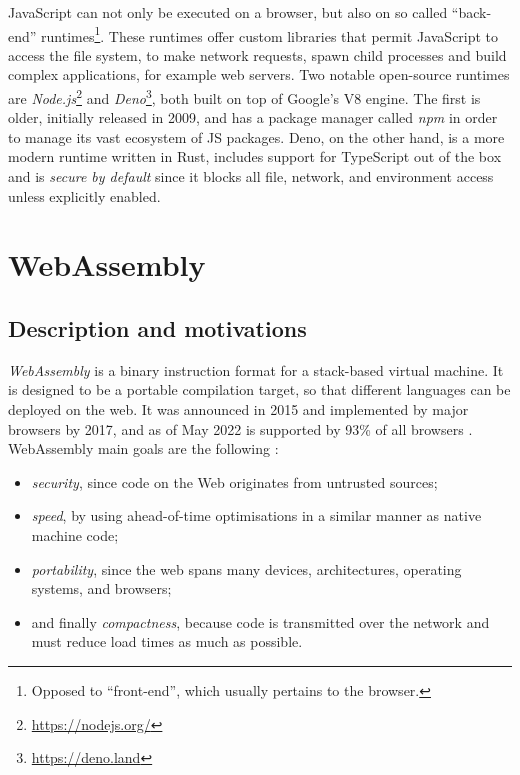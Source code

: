 JavaScript can not only be executed on a browser, but also on so called ``back-end''
runtimes\footnote{Opposed to ``front-end'', which usually pertains to the browser.}.
These runtimes offer custom libraries that permit JavaScript to access the file system, to make network requests,
spawn child processes and build complex applications, for example web servers.
Two notable open-source runtimes are \textit{Node.js}\footnote{\url{https://nodejs.org/}} and \textit{Deno}\footnote{\url{https://deno.land}},
both built on top of Google's V8 engine.
The first is older, initially released in 2009, and has a package manager called \textit{npm}
in order to manage its vast ecosystem of JS packages.
Deno, on the other hand, is a more modern runtime written in Rust, includes support for TypeScript out of the box
and is \textit{secure by default} since it blocks all file, network, and environment access unless explicitly enabled.

\section{WebAssembly}

\subsection{Description and motivations}

\textit{WebAssembly} \cite{wasm-website} is a binary instruction format for a stack-based virtual machine.
It is designed to be a portable compilation target, so that different languages can be deployed on the web.
It was announced in 2015 and implemented by major browsers by 2017, and as of May 2022 is supported
by 93\% of all browsers \cite{caniuse, webassembly-mdn}.
WebAssembly main goals are the following \cite{bringing-the-web-up-to-speed-2017}:
\begin{itemize}
  \item \textit{security}, since code on the Web originates from untrusted sources;
  \item \textit{speed}, by using ahead-of-time optimisations in a similar manner as native machine code;
  \item \textit{portability}, since the web spans many devices, architectures, operating systems, and browsers;
  \item and finally \textit{compactness}, because code is transmitted over the network and must reduce load times as much as possible.
\end{itemize}

